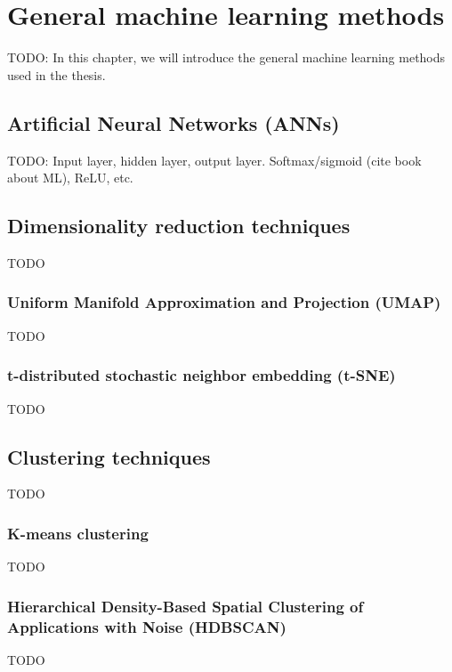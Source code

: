 \chapter{General machine learning methods}
TODO: In this chapter, we will introduce the general machine learning methods used in the thesis.

\section{Artificial Neural Networks (ANNs)}
TODO: Input layer, hidden layer, output layer. Softmax/sigmoid (cite book about ML), ReLU, etc.

\section{Dimensionality reduction techniques}
TODO

\subsection{Uniform Manifold Approximation and Projection (UMAP)}
TODO

\subsection{t-distributed stochastic neighbor embedding (t-SNE)}
TODO

\section{Clustering techniques}
TODO

\subsection{K-means clustering}
TODO

\subsection{Hierarchical Density-Based Spatial Clustering of Applications with Noise (HDBSCAN)}
TODO